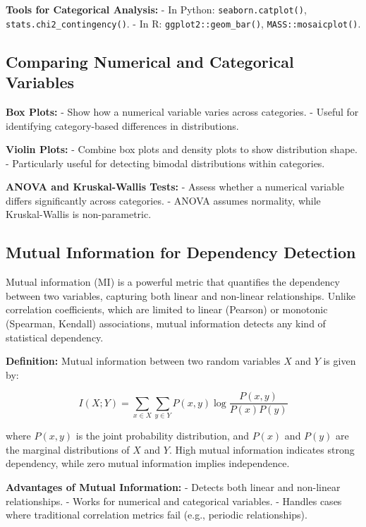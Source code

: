 \documentclass[12pt,openany]{book}
\begin{document}
\textbf{Tools for Categorical Analysis:}
- In Python: \texttt{seaborn.catplot()}, \texttt{stats.chi2\_contingency()}.
- In R: \texttt{ggplot2::geom\_bar()}, \texttt{MASS::mosaicplot()}.
\newline

\subsection{Comparing Numerical and Categorical Variables}

\textbf{Box Plots:}
- Show how a numerical variable varies across categories.
- Useful for identifying category-based differences in distributions.
\newline

\textbf{Violin Plots:}
- Combine box plots and density plots to show distribution shape.
- Particularly useful for detecting bimodal distributions within categories.
\newline

\textbf{ANOVA and Kruskal-Wallis Tests:}
- Assess whether a numerical variable differs significantly across categories.
- ANOVA assumes normality, while Kruskal-Wallis is non-parametric.
\newline

\subsection{Mutual Information for Dependency Detection}

Mutual information (MI) is a powerful metric that quantifies the dependency between two variables, capturing both linear and non-linear relationships. Unlike correlation coefficients, which are limited to linear (Pearson) or monotonic (Spearman, Kendall) associations, mutual information detects any kind of statistical dependency.
\newline

\textbf{Definition:}
Mutual information between two random variables \( X \) and \( Y \) is given by:

\[
I(X; Y) = \sum_{x \in X} \sum_{y \in Y} P(x, y) \log \frac{P(x, y)}{P(x) P(y)}
\]

where \( P(x, y) \) is the joint probability distribution, and \( P(x) \) and \( P(y) \) are the marginal distributions of \( X \) and \( Y \). High mutual information indicates strong dependency, while zero mutual information implies independence.
\newline

\textbf{Advantages of Mutual Information:}
- Detects both linear and non-linear relationships.
- Works for numerical and categorical variables.
- Handles cases where traditional correlation metrics fail (e.g., periodic relationships).
\newline
\end{document}
